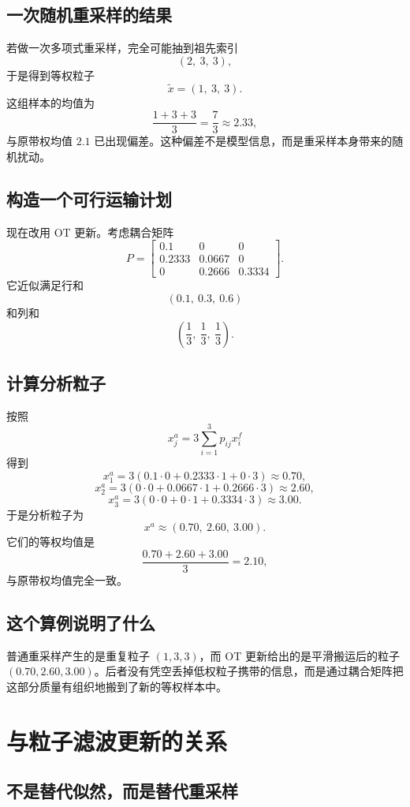 \documentclass[12pt,a4paper]{ctexart}
\begin{document}
\subsection{一次随机重采样的结果}

若做一次多项式重采样，完全可能抽到祖先索引
\[
(2,\ 3,\ 3),
\]
于是得到等权粒子
\[
\tilde x = (1,\ 3,\ 3).
\]
这组样本的均值为
\[
\frac{1 + 3 + 3}{3} = \frac73 \approx 2.33,
\]
与原带权均值 \(2.1\) 已出现偏差。这种偏差不是模型信息，而是重采样本身带来的随机扰动。

\subsection{构造一个可行运输计划}

现在改用 OT 更新。考虑耦合矩阵
\[
P =
\begin{bmatrix}
0.1 & 0   & 0 \\
0.2333 & 0.0667 & 0 \\
0 & 0.2666 & 0.3334
\end{bmatrix}.
\]
它近似满足行和
\[
(0.1,\ 0.3,\ 0.6)
\]
和列和
\[
\left(\frac13,\ \frac13,\ \frac13\right).
\]

\subsection{计算分析粒子}

按照
\[
x_j^a = 3 \sum_{i=1}^3 p_{ij} x_i^f
\]
得到
\[
x_1^a = 3(0.1 \cdot 0 + 0.2333 \cdot 1 + 0 \cdot 3) \approx 0.70,
\]
\[
x_2^a = 3(0 \cdot 0 + 0.0667 \cdot 1 + 0.2666 \cdot 3) \approx 2.60,
\]
\[
x_3^a = 3(0 \cdot 0 + 0 \cdot 1 + 0.3334 \cdot 3) \approx 3.00.
\]
于是分析粒子为
\[
x^a \approx (0.70,\ 2.60,\ 3.00).
\]
它们的等权均值是
\[
\frac{0.70 + 2.60 + 3.00}{3} = 2.10,
\]
与原带权均值完全一致。

\subsection{这个算例说明了什么}

普通重采样产生的是重复粒子 \((1,3,3)\)，而 OT 更新给出的是平滑搬运后的粒子 \((0.70, 2.60, 3.00)\)。后者没有凭空丢掉低权粒子携带的信息，而是通过耦合矩阵把这部分质量有组织地搬到了新的等权样本中。

\section{与粒子滤波更新的关系}

\subsection{不是替代似然，而是替代重采样}
\end{document}
